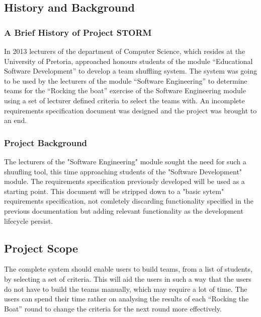 \subsection{History and Background}
\subsubsection{A Brief History of Project STORM}
In 2013 lecturers of the department of Computer Science, which resides at the University of Pretoria,
approached honours students of the module “Educational Software Development” to develop a team
shuffling system. 
The system was going to be used by the lecturers of the module “Software Engineering” to
determine teams for the “Rocking the boat” exercise of the Software Engineering module using a
set of lecturer ­defined criteria to select the teams with. An incomplete requirements specification document
was designed and the project was brought to an end. 

\subsubsection{Project Background}
The lecturers of the "Software Engineering" module sought the need for such a shuufling tool, this
time approaching students of the "Software Development" module. The requirements specification previously 
developed will be used as a starting point. This document will be stripped down to a "basic sytem" requirements
specification, not comletely discarding functionality specified in the previous documentation but adding relevant functionality
as the development lifecycle persist.

\subsection{Project Scope}
The complete system should enable users to build teams, from a list of students, by selecting a
set of criteria. This will aid the users in such a way that the users do not have to build the teams
manually, which may require a lot of time. The users can spend their time rather on analysing
the results of each “Rocking the Boat” round to change the criteria for the next round more
effectively.

